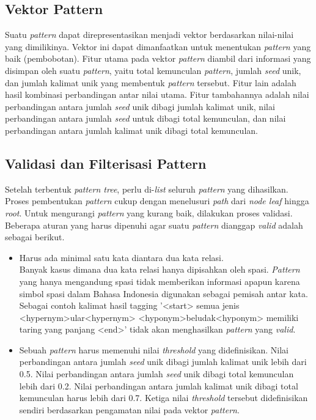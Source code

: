 
\subsection{Vektor Pattern}
Suatu \textit{pattern} dapat direpresentasikan menjadi vektor berdasarkan nilai-nilai yang dimilikinya. Vektor ini dapat dimanfaatkan untuk menentukan \textit{pattern} yang baik (pembobotan). Fitur utama pada vektor \textit{pattern} diambil dari informasi yang disimpan oleh suatu \textit{pattern}, yaitu total kemunculan \textit{pattern}, jumlah \textit{seed} unik, dan jumlah kalimat unik yang membentuk \textit{pattern} tersebut. Fitur lain adalah hasil kombinasi perbandingan antar nilai utama. Fitur tambahannya adalah nilai perbandingan antara jumlah \textit{seed} unik dibagi jumlah kalimat unik, nilai perbandingan antara jumlah \textit{seed} untuk dibagi total kemunculan, dan nilai perbandingan antara jumlah kalimat unik dibagi total kemunculan.

\subsection{Validasi dan Filterisasi Pattern}
Setelah terbentuk \textit{pattern tree}, perlu di-\textit{list} seluruh \textit{pattern} yang dihasilkan. Proses pembentukan \textit{pattern} cukup dengan menelusuri \textit{path} dari \textit{\textit{node} leaf} hingga \textit{root}. Untuk mengurangi \textit{pattern} yang kurang baik, dilakukan proses validasi. Beberapa aturan yang harus dipenuhi agar suatu \textit{pattern} dianggap \textit{valid} adalah sebagai berikut.
\begin{itemize}
  \item Harus ada minimal satu kata diantara dua kata relasi. \\
  Banyak kasus dimana dua kata relasi hanya dipisahkan oleh spasi. \textit{Pattern} yang hanya mengandung spasi tidak memberikan informasi apapun karena simbol spasi dalam Bahasa Indonesia digunakan sebagai pemisah antar kata. Sebagai contoh kalimat hasil tagging '<start> semua jenis <hypernym>ular<hypernym> <hyponym>beludak<hyponym> memiliki taring yang panjang <end>' tidak akan menghasilkan \textit{pattern} yang \textit{valid}.
  \item Sebuah \textit{pattern} harus memenuhi nilai \textit{threshold} yang didefinisikan. Nilai perbandingan antara jumlah \textit{seed} unik dibagi jumlah kalimat unik lebih dari 0.5. Nilai perbandingan antara jumlah \textit{seed} unik dibagi total kemunculan lebih dari 0.2. Nilai perbandingan antara jumlah kalimat unik dibagi total kemunculan harus lebih dari 0.7. Ketiga nilai \textit{threshold} tersebut didefinisikan sendiri berdasarkan pengamatan nilai pada vektor \textit{pattern}.
\end{itemize}

